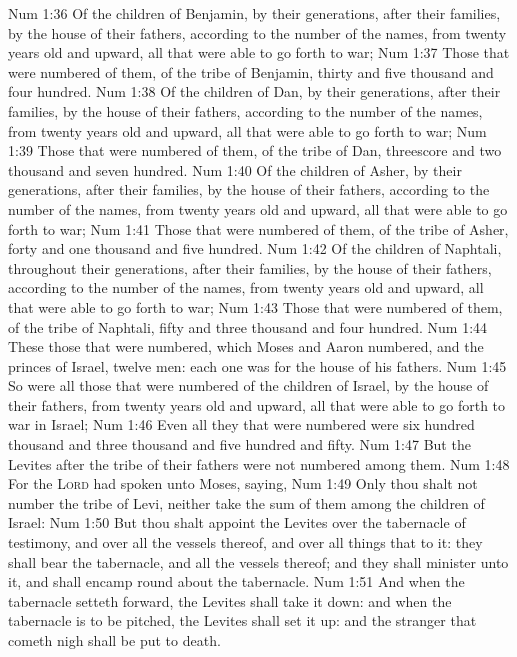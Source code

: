 \vs Num 1:36 Of the children of Benjamin, by their generations, after their families, by the house of their fathers, according to the number of the names, from twenty years old and upward, all that were able to go forth to war;
\vs Num 1:37 Those that were numbered of them,  of the tribe of Benjamin,  thirty and five thousand and four hundred.
\vs Num 1:38 Of the children of Dan, by their generations, after their families, by the house of their fathers, according to the number of the names, from twenty years old and upward, all that were able to go forth to war;
\vs Num 1:39 Those that were numbered of them,  of the tribe of Dan,  threescore and two thousand and seven hundred.
\vs Num 1:40 Of the children of Asher, by their generations, after their families, by the house of their fathers, according to the number of the names, from twenty years old and upward, all that were able to go forth to war;
\vs Num 1:41 Those that were numbered of them,  of the tribe of Asher,  forty and one thousand and five hundred.
\vs Num 1:42 Of the children of Naphtali, throughout their generations, after their families, by the house of their fathers, according to the number of the names, from twenty years old and upward, all that were able to go forth to war;
\vs Num 1:43 Those that were numbered of them,  of the tribe of Naphtali,  fifty and three thousand and four hundred.
\vs Num 1:44 These  those that were numbered, which Moses and Aaron numbered, and the princes of Israel,  twelve men: each one was for the house of his fathers.
\vs Num 1:45 So were all those that were numbered of the children of Israel, by the house of their fathers, from twenty years old and upward, all that were able to go forth to war in Israel;
\vs Num 1:46 Even all they that were numbered were six hundred thousand and three thousand and five hundred and fifty.
\vs Num 1:47 But the Levites after the tribe of their fathers were not numbered among them.
\vs Num 1:48 For the \textsc{Lord} had spoken unto Moses, saying,
\vs Num 1:49 Only thou shalt not number the tribe of Levi, neither take the sum of them among the children of Israel:
\vs Num 1:50 But thou shalt appoint the Levites over the tabernacle of testimony, and over all the vessels thereof, and over all things that  to it: they shall bear the tabernacle, and all the vessels thereof; and they shall minister unto it, and shall encamp round about the tabernacle.
\vs Num 1:51 And when the tabernacle setteth forward, the Levites shall take it down: and when the tabernacle is to be pitched, the Levites shall set it up: and the stranger that cometh nigh shall be put to death.
